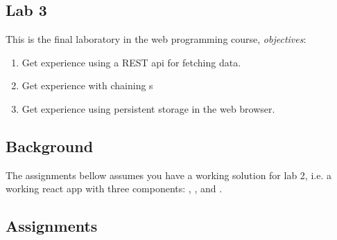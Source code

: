 \documentclass[fleqn, article, a4paper]{memoir}
\begin{document}
\maketitle
\thispagestyle{titlepage}
\vspace{-4cm}

\subsection*{Lab 3}

\n This is the final laboratory in the web programming course, \emph{objectives}:

\begin{enumerate}\firmlist
\item Get experience using a REST api for fetching data.
\item Get experience with chaining s
\item Get experience using persistent storage in the web browser.
\end{enumerate}

\subsection*{Background}

The assignments bellow assumes you have a working solution for lab 2, i.e. a working react app with three components: , , and .

\subsection*{Assignments}
\end{document}
